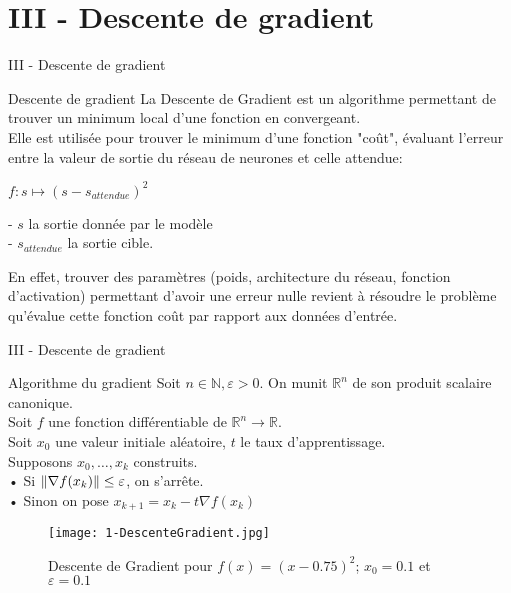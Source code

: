 
\section{III - Descente de gradient}
\begin{frame}{III - Descente de gradient}
    \begin{block}{Descente de gradient}
        La Descente de Gradient est un algorithme permettant de trouver un minimum local d'une fonction en convergeant. \\
        Elle est utilisée pour trouver le minimum d'une fonction "coût", évaluant l'erreur entre la valeur de sortie du réseau de neurones et celle attendue: \\
        \begin{center}
            $f : s \mapsto (s - s_{attendue})^2$\\
        \end{center}
        - $s$ la sortie donnée par le modèle \\
        - $s_{attendue}$ la sortie cible. \\
        
    \end{block}
    \begin{exampleblock}{}
        En effet, trouver des paramètres (poids, architecture du réseau, fonction d'activation) permettant d'avoir une erreur nulle revient à résoudre le problème qu'évalue cette fonction coût par rapport aux données d'entrée.
    \end{exampleblock}
\end{frame}


\begin{frame}{III - Descente de gradient}
    \begin{block}{Algorithme du gradient}
        Soit $n \in \mathbb{N}, \varepsilon > 0$. On munit $\mathbb{R}^n$ de son produit scalaire canonique. \\
        Soit $f$ une fonction différentiable de $\mathbb{R}^n \to \mathbb{R}$. \\
        Soit $x_0$ une valeur initiale aléatoire, $t$ le taux d'apprentissage. \\
        Supposons $x_0, \ldots, x_k$ construits. \\
        • Si $\| \nabla f(x_k) \| \leq \varepsilon$, on s'arrête. \\
        • Sinon on pose $x_{k+1} = x_k - t \nabla f(x_k)$ \\
    \end{block}
    \begin{figure}
        \centering
        \texttt{[image: 1-DescenteGradient.jpg]}
        \caption{Descente de Gradient pour $f(x) = (x-0.75)^2$; $x_0=0.1$ et $\varepsilon = 0.1$}
    \end{figure}
\end{frame}


